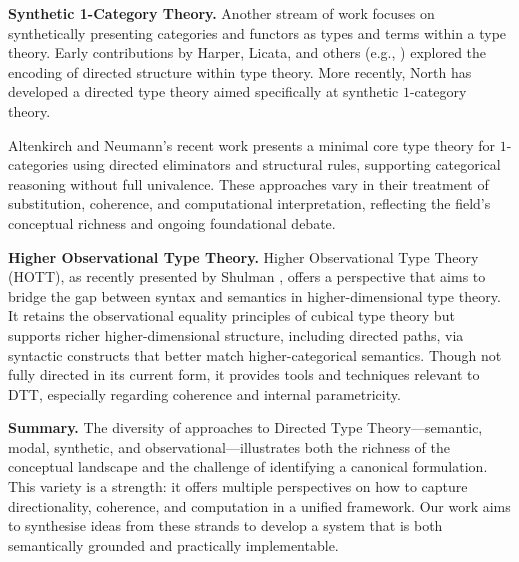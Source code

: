 \documentclass[a4paper,11pt]{article}
\renewcommand{\paragraph}[1]{\textbf{#1.}}
\begin{document}
\paragraph{Synthetic 1-Category Theory}
%
Another stream of work focuses on synthetically presenting categories
and functors as types and terms within a type theory. Early
contributions by Harper, Licata, and others (e.g., \cite{licata:2011})
explored the encoding of directed structure within type theory. More
recently, North has developed a directed type theory \cite{north_2019}
aimed specifically at synthetic $1$-category theory.

Altenkirch and Neumann’s recent work
\cite{altenkirch_neumann_2024} presents a minimal core type theory for
$1$-categories using directed eliminators and structural rules,
supporting categorical reasoning without full univalence. These
approaches vary in their treatment of substitution, coherence, and
computational interpretation, reflecting the field's conceptual
richness and ongoing foundational debate.

\paragraph{Higher Observational Type Theory}
Higher Observational Type Theory (HOTT), as recently presented by
Shulman \cite{shulman2022}, offers a perspective that aims to bridge
the gap between syntax and semantics in higher-dimensional type
theory. It retains the observational equality principles of cubical
type theory but supports richer higher-dimensional structure,
including directed paths, via syntactic constructs that better match
higher-categorical semantics. Though not fully directed in its current
form, it provides tools and techniques relevant to DTT, especially
regarding coherence and internal parametricity.

\paragraph{Summary}
The diversity of approaches to Directed Type Theory—semantic, modal,
synthetic, and observational—illustrates both the richness of the
conceptual landscape and the challenge of identifying a canonical
formulation. This variety is a strength: it offers multiple
perspectives on how to capture directionality, coherence, and
computation in a unified framework. Our work aims to synthesise ideas
from these strands to develop a system that is both semantically
grounded and practically implementable.
\end{document}
